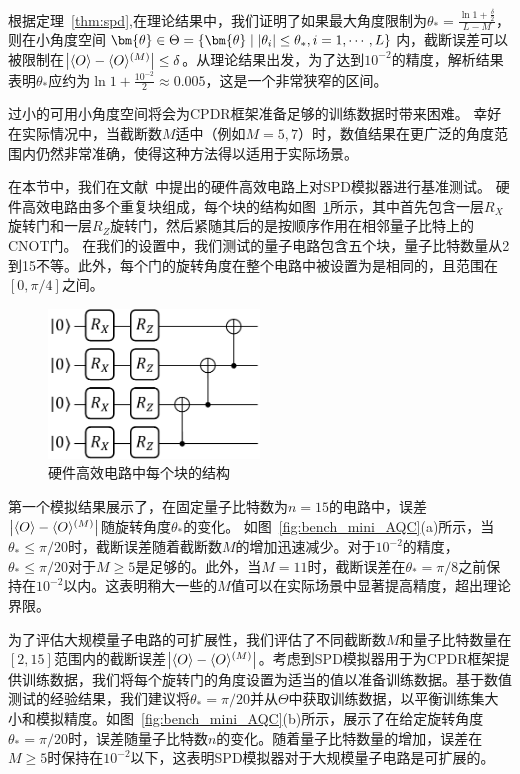 根据定理~\ref{thm:spd},在理论结果中，我们证明了如果最大角度限制为$\theta_*=\frac{\ln{1+\frac{\delta}{2}}}{L-M}$，则在小角度空间$\bm{\theta}\in\Theta=\{\bm{\theta}\mid \abs{\theta_i}\leq \theta_* ,i=1,\cdots,L \}$内，截断误差可以被限制在$\abs{\langle O \rangle - \langle O \rangle ^{(M)}}\leq \delta$。从理论结果出发，为了达到$10^{-2}$的精度，解析结果表明$\theta_*$应约为$\ln{1+\frac{10^{-2}}{2}}\approx 0.005$，这是一个非常狭窄的区间。

过小的可用小角度空间将会为CPDR框架准备足够的训练数据时带来困难。
幸好在实际情况中，当截断数$M$适中（例如$M=5,7$）时，数值结果在更广泛的角度范围内仍然非常准确，使得这种方法得以适用于实际场景。


在本节中，我们在文献~\cite{sim2019expressibility}中提出的硬件高效电路上对SPD模拟器进行基准测试。
硬件高效电路由多个重复块组成，每个块的结构如图~\ref{fig:hardware_block}所示，其中首先包含一层$R_X$旋转门和一层$R_Z$旋转门，然后紧随其后的是按顺序作用在相邻量子比特上的CNOT门。
在我们的设置中，我们测试的量子电路包含五个块，量子比特数量从2到15不等。此外，每个门的旋转角度在整个电路中被设置为是相同的，且范围在$[0,\pi/4]$之间。

\begin{figure}[!ht]
    \centering
\includegraphics[width=0.5\textwidth]{figures/circuit_20241207.pdf}
    \caption{硬件高效电路中每个块的结构}
\label{fig:hardware_block}
\end{figure}


第一个模拟结果展示了，在固定量子比特数为$n=15$的电路中，误差$\abs{\langle O \rangle - \langle O \rangle^{(M)}}$随旋转角度$\theta_*$的变化。
如图~\ref{fig:bench_mini_AQC}(a)所示，当$\theta_*\leq \pi/20$时，截断误差随着截断数$M$的增加迅速减少。对于$10^{-2}$的精度，$\theta_*\leq \pi/20$对于$M\geq 5$是足够的。此外，当$M=11$时，截断误差在$\theta_*=\pi/8$之前保持在$10^{-2}$以内。这表明稍大一些的$M$值可以在实际场景中显著提高精度，超出理论界限。

为了评估大规模量子电路的可扩展性，我们评估了不同截断数$M$和量子比特数量在$[2,15]$范围内的截断误差$\abs{\langle O \rangle - \langle O \rangle ^{(M)}}$。考虑到SPD模拟器用于为CPDR框架提供训练数据，我们将每个旋转门的角度设置为适当的值以准备训练数据。基于数值测试的经验结果，我们建议将$\theta_* = \pi/20$并从$\Theta$中获取训练数据，以平衡训练集大小和模拟精度。如图~\ref{fig:bench_mini_AQC}(b)所示，展示了在给定旋转角度$\theta_*=\pi/20$时，误差随量子比特数$n$的变化。随着量子比特数量的增加，误差在$M\geq 5$时保持在$10^{-2}$以下，这表明SPD模拟器对于大规模量子电路是可扩展的。


